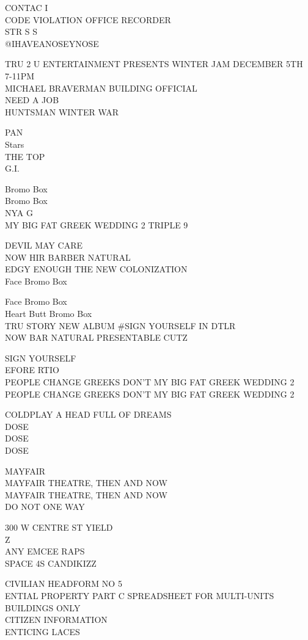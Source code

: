 \documentclass[10pt,letterpaper]{article}
\begin{document}
CONTAC I\\
CODE VIOLATION OFFICE RECORDER\\
STR S S\\
@IHAVEANOSEYNOSE

TRU 2 U ENTERTAINMENT PRESENTS WINTER JAM DECEMBER 5TH 7{-}11PM\\
MICHAEL BRAVERMAN BUILDING OFFICIAL\\
NEED A JOB\\
HUNTSMAN WINTER WAR

PAN\\
Stars\\
THE TOP\\
G.I.

Bromo Box\\
Bromo Box\\
NYA G\\
MY BIG FAT GREEK WEDDING 2 TRIPLE 9

DEVIL MAY CARE\\
NOW HIR BARBER NATURAL\\
EDGY ENOUGH THE NEW COLONIZATION\\
Face Bromo Box

Face Bromo Box\\
Heart Butt Bromo Box\\
TRU STORY NEW ALBUM \#SIGN YOURSELF IN DTLR\\
NOW BAR NATURAL PRESENTABLE CUTZ

SIGN YOURSELF\\
EFORE RTIO\\
PEOPLE CHANGE GREEKS DON'T MY BIG FAT GREEK WEDDING 2\\
PEOPLE CHANGE GREEKS DON'T MY BIG FAT GREEK WEDDING 2

COLDPLAY A HEAD FULL OF DREAMS\\
DOSE\\
DOSE\\
DOSE

MAYFAIR\\
MAYFAIR THEATRE, THEN AND NOW\\
MAYFAIR THEATRE, THEN AND NOW\\
DO NOT ONE WAY

300 W CENTRE ST YIELD\\
Z\\
ANY EMCEE RAPS\\
SPACE 4S CANDIKIZZ

CIVILIAN HEADFORM NO 5\\
ENTIAL PROPERTY PART C SPREADSHEET FOR MULTI{-}UNITS BUILDINGS ONLY\\
CITIZEN INFORMATION\\
ENTICING LACES
\end{document}
